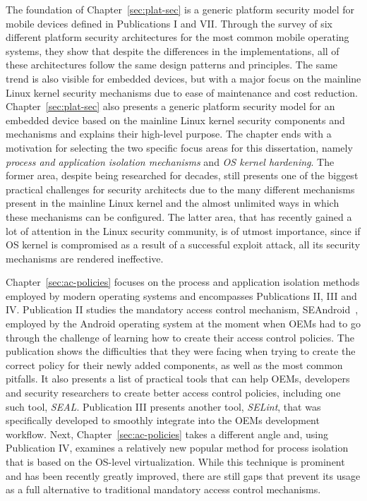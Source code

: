 The foundation of Chapter~\ref{sec:plat-sec} is a generic platform security model for mobile devices defined in Publications I and VII. Through the survey of six different platform security architectures for the most common mobile operating systems, they show that despite the differences in the implementations, all of these architectures follow the same design patterns and principles. The same trend is also visible for embedded devices, but with a major focus on the mainline Linux kernel security mechanisms due to ease of maintenance and cost reduction. Chapter~\ref{sec:plat-sec} also presents a generic platform security model for an embedded device based on the mainline Linux kernel security components and mechanisms and explains their high-level purpose. The chapter ends with a motivation for selecting the two specific focus areas for this dissertation, namely \textit{process and application isolation mechanisms} and \textit{OS kernel hardening}. The former area, despite being researched for decades, still presents one of the biggest practical challenges
for security architects due to the many different mechanisms present in the mainline Linux kernel and the almost unlimited ways in which these mechanisms can be configured. The latter area, that has recently gained a lot of attention in the Linux security community, is of utmost importance, since if OS kernel is compromised as a result of a successful exploit attack, all its security mechanisms are rendered ineffective.

Chapter~\ref{sec:ac-policies} focuses on the process and application isolation methods employed by modern operating systems and encompasses Publications II, III and IV. Publication II studies the mandatory access control mechanism, SEAndroid~\cite{smalley12}, employed by the Android operating system at the moment when OEMs had to go through the challenge of learning how to create their access control policies. The publication shows the difficulties that they were facing when trying to create the correct policy for their newly added components, as well as the most common pitfalls. It also presents a list of practical tools that can help OEMs, developers and security researchers to create better access control policies, including one such tool, \textit{SEAL}. Publication III presents another tool, \textit{SELint}, that was specifically developed to smoothly integrate into the OEMs development workflow. Next, Chapter~\ref{sec:ac-policies} takes a different angle and, using Publication IV, examines a relatively new popular method for process isolation that is based on the OS-level virtualization. While this technique is prominent and has been recently greatly improved, there are still gaps that prevent its usage as a full alternative to traditional mandatory access control mechanisms.

